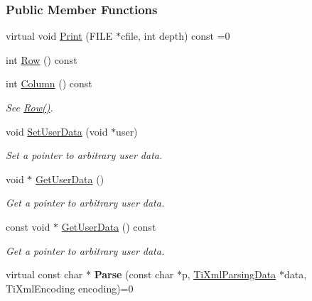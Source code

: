 \subsubsection*{Public Member Functions}
\begin{DoxyCompactItemize}
\item 
virtual void \hyperlink{class_ti_xml_base_a0de56b3f2ef14c65091a3b916437b512}{Print} (FILE $\ast$cfile, int depth) const =0
\item 
int \hyperlink{class_ti_xml_base_a024bceb070188df92c2a8d8852dd0853}{Row} () const 
\item 
\hypertarget{class_ti_xml_base_ab54bfb9b70fe6dd276e7b279cab7f003}{
int \hyperlink{class_ti_xml_base_ab54bfb9b70fe6dd276e7b279cab7f003}{Column} () const }
\label{class_ti_xml_base_ab54bfb9b70fe6dd276e7b279cab7f003}

\begin{DoxyCompactList}\small\item\em See \hyperlink{class_ti_xml_base_a024bceb070188df92c2a8d8852dd0853}{Row()}. \item\end{DoxyCompactList}\item 
\hypertarget{class_ti_xml_base_ac6b3e0f790930d4970ec30764e937b5d}{
void \hyperlink{class_ti_xml_base_ac6b3e0f790930d4970ec30764e937b5d}{SetUserData} (void $\ast$user)}
\label{class_ti_xml_base_ac6b3e0f790930d4970ec30764e937b5d}

\begin{DoxyCompactList}\small\item\em Set a pointer to arbitrary user data. \item\end{DoxyCompactList}\item 
\hypertarget{class_ti_xml_base_a6559a530ca6763fc301a14d77ed28c17}{
void $\ast$ \hyperlink{class_ti_xml_base_a6559a530ca6763fc301a14d77ed28c17}{GetUserData} ()}
\label{class_ti_xml_base_a6559a530ca6763fc301a14d77ed28c17}

\begin{DoxyCompactList}\small\item\em Get a pointer to arbitrary user data. \item\end{DoxyCompactList}\item 
\hypertarget{class_ti_xml_base_ad0120210e4680ef2088601753ce0ede4}{
const void $\ast$ \hyperlink{class_ti_xml_base_ad0120210e4680ef2088601753ce0ede4}{GetUserData} () const }
\label{class_ti_xml_base_ad0120210e4680ef2088601753ce0ede4}

\begin{DoxyCompactList}\small\item\em Get a pointer to arbitrary user data. \item\end{DoxyCompactList}\item 
\hypertarget{class_ti_xml_base_a00e4edb0219d00a1379c856e5a1d2025}{
virtual const char $\ast$ {\bfseries Parse} (const char $\ast$p, \hyperlink{class_ti_xml_parsing_data}{TiXmlParsingData} $\ast$data, TiXmlEncoding encoding)=0}
\label{class_ti_xml_base_a00e4edb0219d00a1379c856e5a1d2025}

\end{DoxyCompactItemize}
